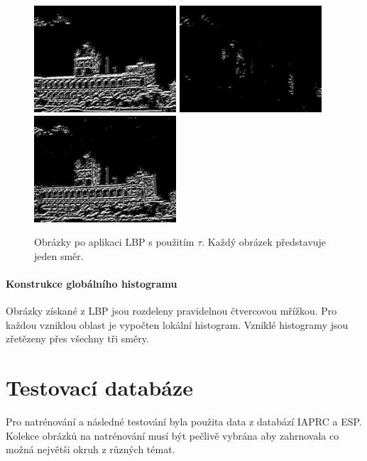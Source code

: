 \documentclass[czech,BP]{thesiskiv}
\begin{document}
\begin{figure}[H]
	\centering
	\includegraphics[width=150pt]{./img/lbp_3_1.jpg}
	\includegraphics[width=150pt]{./img/lbp_3_2.jpg}
	\includegraphics[width=150pt]{./img/lbp_3_3.jpg}
	\caption{Obrázky po aplikaci LBP s použitím $\tau$. Každý obrázek představuje jeden směr.}
\end{figure}

\subsubsection{Konstrukce globálního histogramu}
\par Obrázky získané z LBP jsou rozdeleny pravidelnou čtvercovou mřížkou. Pro každou vzniklou oblast je vypočten lokální histogram. Vzniklé histogramy jsou zřetězeny přes všechny tři směry.

\chapter{Testovací databáze}
\par Pro natrénování a následné testování byla použita data z databází IAPRC a ESP. Kolekce obrázků na natrénování musí být pečlivě vybrána aby zahrnovala co možná největši okruh z různých témat. 
\end{document}
